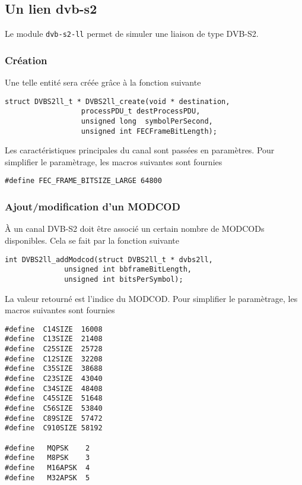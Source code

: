 \documentclass{article}
\begin{document}
\subsection{Un lien {\sc dvb-s2}}

   Le module {\tt dvb-s2-ll} permet de simuler une liaison de type
DVB-S2.

\subsubsection{Création}

Une telle entité sera créée grâce à la fonction suivante

\begin{verbatim}
struct DVBS2ll_t * DVBS2ll_create(void * destination,
				  processPDU_t destProcessPDU,
				  unsigned long  symbolPerSecond,
				  unsigned int FECFrameBitLength);
\end{verbatim}

   Les caractéristiques principales du canal sont passées en
   paramètres.
Pour simplifier le
paramètrage, les macros suivantes sont fournies

\begin{verbatim}
#define FEC_FRAME_BITSIZE_LARGE 64800
\end{verbatim}

\subsubsection{Ajout/modification d'un MODCOD}

   À un canal DVB-S2 doit être associé un certain nombre de MODCODs
disponibles. Cela se fait par la fonction suivante

\begin{verbatim}
int DVBS2ll_addModcod(struct DVBS2ll_t * dvbs2ll,
		      unsigned int bbframeBitLength,
		      unsigned int bitsPerSymbol);
\end{verbatim}

   La valeur retourné est l'indice du MODCOD. Pour simplifier le
paramètrage, les macros suivantes sont fournies

\begin{verbatim}
#define  C14SIZE  16008
#define  C13SIZE  21408
#define  C25SIZE  25728
#define  C12SIZE  32208
#define  C35SIZE  38688
#define  C23SIZE  43040
#define  C34SIZE  48408
#define  C45SIZE  51648
#define  C56SIZE  53840
#define  C89SIZE  57472
#define  C910SIZE 58192

#define   MQPSK    2
#define   M8PSK    3
#define   M16APSK  4
#define   M32APSK  5
\end{verbatim}
\end{document}
